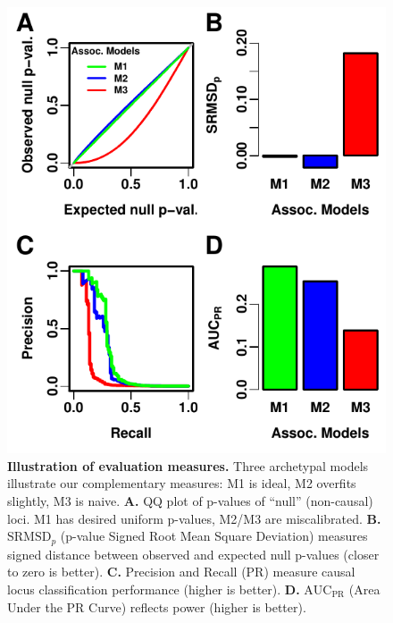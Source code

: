 \documentclass[11pt]{article}
\newcommand{\rmsd}{\text{SRMSD}_p}
\newcommand{\auc}{\text{AUC}_\text{PR}}
\begin{document}
\begin{figure}[bp!]
  \centering
  \includegraphics{sim-n1000-k10-f0.1-s0.5-g1/measures-illustration.pdf}
  \caption{
    {\bf Illustration of evaluation measures.}
    Three archetypal models illustrate our complementary measures:
    M1 is ideal, M2 overfits slightly, M3 is naive.
    \textbf{A.}
    QQ plot of p-values of ``null'' (non-causal) loci.
    M1 has desired uniform p-values, M2/M3 are miscalibrated.
    \textbf{B.}
    $\rmsd$ (p-value Signed Root Mean Square Deviation) measures signed distance between observed and expected null p-values (closer to zero is better).
    \textbf{C.}
    Precision and Recall (PR) measure causal locus classification performance (higher is better).
    \textbf{D.}
    $\auc$ (Area Under the PR Curve) reflects power (higher is better).
  }
  \label{fig:measures_illustration}
\end{figure}
\end{document}
